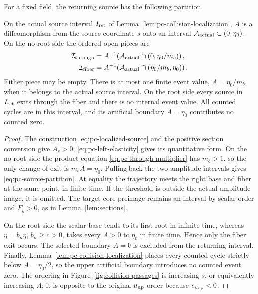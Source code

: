 For a fixed field, the returning source has the following partition.

\begin{lemma}
\label{lem:pc-source-partition}
On the actual source interval $I_{\rm ret}$ of
Lemma~\ref{lem:pc-collision-localization}, $A$ is a diffeomorphism from the
source coordinate $s$ onto an interval
$\mathcal A_{\rm actual}\subset(0,\eta_0)$. On the no-root side the
ordered open pieces are
\begin{equation}
\label{eq:pc-source-partition}
 \begin{aligned}
 \mathcal I_{\rm through}
   &=A^{-1}\!\left(\mathcal A_{\rm actual}
                    \cap(0,\eta_0/m_b)\right),\\
 \mathcal I_{\rm fiber}
   &=A^{-1}\!\left(\mathcal A_{\rm actual}
                    \cap(\eta_0/m_b,\eta_0)\right).
 \end{aligned}
\end{equation}
Either piece may be empty. There is at most one finite event value,
$A=\eta_0/m_b$, when it belongs to the actual source interval. On the
root side every source in $I_{\rm ret}$ exits through the fiber and
there is no internal event value. All counted cycles are in this
interval, and its artificial boundary $A=\eta_0$ contributes no counted
zero.
\end{lemma}
\begin{proof}
The construction \eqref{eq:pc-localized-source} and the positive section
conversion give $A_s>0$; \eqref{eq:pc-left-elasticity} gives its
quantitative form. On the no-root side the product equation
\eqref{eq:pc-through-multiplier} has $m_b>1$, so the only change of
exit is $m_bA=\eta_0$. Pulling back the two amplitude intervals gives
\eqref{eq:pc-source-partition}. At equality the trajectory meets the
right base and fiber at the same point, in finite time. If the threshold
is outside the actual amplitude image, it is omitted. The target-core
preimage remains an interval by scalar order and $F_y>0$, as in
Lemma~\ref{lem:sections}.

On the root side the scalar base tends to its first root in infinite
time, whereas $\dot\eta=b_n\eta$, $b_n\ge c>0$, takes every $A>0$ to
$\eta_0$ in finite time. Hence only the fiber exit occurs. The selected
boundary $A=0$ is excluded from the returning interval. Finally,
Lemma~\ref{lem:pc-collision-localization} places every counted cycle
strictly below $A=\eta_0/2$, so the upper artificial boundary introduces
no counted event zero. The ordering in Figure~\ref{fig:collision-passages} is
increasing $s$, or equivalently increasing $A$; it is opposite to the
original $u_{\rm up}$-order because $s_{u_{\rm up}}<0$.
\end{proof}

